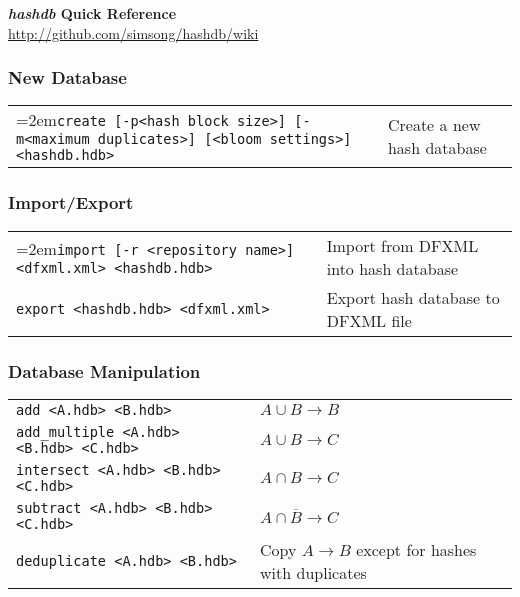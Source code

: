 \documentclass[12pt]{article}
\newcommand{\hdb}{\emph{hashdb}\xspace}
\begin{document}
\begin{center}
\textbf{\Large \hdb Quick Reference} \\
\url{http://github.com/simsong/hashdb/wiki}
\end{center}

\subsubsection*{New Database}
\begin{tabular}{p{10 cm} p{9 cm} }
\hangindent=2em\texttt{create [-p<hash block size>] [-m<maximum duplicates>] [<bloom settings>] <hashdb.hdb>} & Create a new hash database \\
\end{tabular}

\subsubsection*{Import/Export}
\begin{tabular}{p{10 cm} p{9 cm} }
\hangindent=2em\texttt{import [-r <repository name>] <dfxml.xml> <hashdb.hdb>} & Import from DFXML into hash database \\
\texttt{export <hashdb.hdb> <dfxml.xml>} & Export hash database to DFXML file \\
\end{tabular}

\subsubsection*{Database Manipulation}
\begin{tabular}{p{10 cm} p{9 cm} }
\texttt{add <A.hdb> <B.hdb>} & $A \cup B \rightarrow B$ \\
\texttt{add\_multiple <A.hdb> <B.hdb> <C.hdb>} & $A \cup B \rightarrow C$ \\
\texttt{intersect <A.hdb> <B.hdb> <C.hdb>} & $A \cap B \rightarrow C$ \\
\texttt{subtract <A.hdb> <B.hdb> <C.hdb>} & $A \cap \overline B \rightarrow C$ \\
\texttt{deduplicate <A.hdb> <B.hdb>} & Copy $A \rightarrow B$ except for hashes with duplicates \\
\end{tabular}
\end{document}

